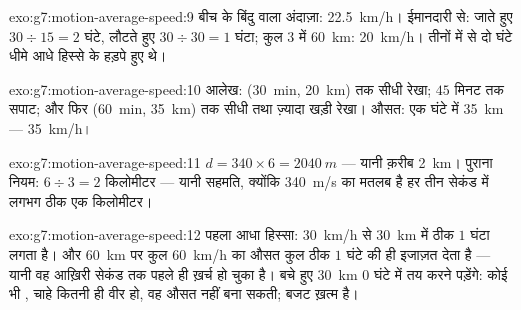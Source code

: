\begin{solution}{exo:g7:motion-average-speed:9}
बीच के बिंदु वाला अंदाज़ा: \qty{22.5}{km/h}। ईमानदारी से: जाते हुए
$30 \div 15 = 2$ घंटे, लौटते हुए $30 \div 30 = 1$ घंटा; कुल $3$ 
में \qty{60}{km}: \qty{20}{km/h}। तीनों में से दो घंटे धीमे आधे हिस्से
के हड़पे हुए थे।
\end{solution}

\begin{solution}{exo:g7:motion-average-speed:10}
आलेख: (\qty{30}{min}, \qty{20}{km}) तक सीधी रेखा; $45$ मिनट तक सपाट;
और फिर (\qty{60}{min}, \qty{35}{km}) तक सीधी तथा ज़्यादा खड़ी रेखा।
औसत: एक घंटे में \qty{35}{km} --- \qty{35}{km/h}।
\end{solution}

\begin{solution}{exo:g7:motion-average-speed:11}
$d = 340 \times 6 = \qty{2040}{m}$ --- यानी क़रीब \qty{2}{km}। पुराना
नियम: $6 \div 3 = 2$ किलोमीटर --- यानी सहमति, क्योंकि \qty{340}{m/s}
का मतलब है हर तीन सेकंड में लगभग ठीक एक किलोमीटर।
\end{solution}

\begin{solution}{exo:g7:motion-average-speed:12}
पहला आधा हिस्सा: \qty{30}{km/h} से \qty{30}{km} में ठीक $1$ घंटा लगता
है। और \qty{60}{km} पर कुल \qty{60}{km/h} का औसत कुल ठीक $1$ घंटे की
ही इजाज़त देता है --- यानी वह आख़िरी सेकंड तक पहले ही ख़र्च हो चुका
है। बचे हुए \qty{30}{km} $0$ घंटे में तय करने पड़ेंगे: कोई भी ,
चाहे कितनी ही वीर हो, वह औसत नहीं बना सकती; बजट ख़त्म है।
\end{solution}

